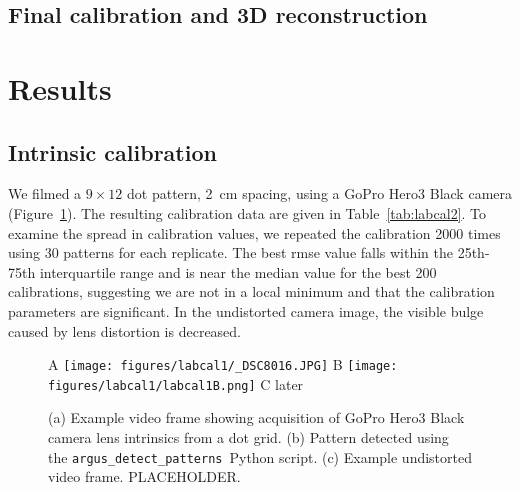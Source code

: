 \documentclass[fleqn,10pt]{wlpeerj}
\newcommand{\detectpatterns}{\texttt{argus\_detect\_patterns}}
\begin{document}
\subsection*{Final calibration and 3D reconstruction}









\section*{Results}

\subsection*{Intrinsic calibration}
We filmed a $9 \times 12$ dot pattern, \SI{2}{\centi\meter} spacing, using a GoPro Hero3 Black camera (Figure~\ref{fig:labcal1}).  The resulting calibration data are given in Table~\ref{tab:labcal2}. To examine the spread in calibration values, we repeated the calibration 2000 times using 30 patterns for each replicate. The best rmse value falls within the 25th-75th interquartile range and is near the median value for the best 200 calibrations, suggesting we are not in a local minimum and that the calibration parameters are significant.  In the undistorted camera image, the visible bulge caused by lens distortion is decreased. 


\begin{figure}
\caption{(a) Example video frame showing acquisition of GoPro Hero3 Black camera lens intrinsics from a dot grid.  (b) Pattern detected using the \detectpatterns\ Python script. (c) Example undistorted video frame. PLACEHOLDER. 
}%
\label{fig:labcal1}
A \texttt{[image: figures/labcal1/\_DSC8016.JPG]}
B \texttt{[image: figures/labcal1/labcal1B.png]}
C later
\end{figure}
\end{document}
